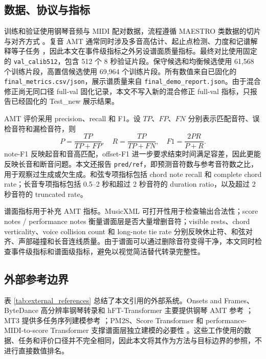 \documentclass[UTF8,a4paper,zihao=-4]{ctexart}
\newcommand{\code}[1]{\texttt{#1}}
\begin{document}


\subsection{数据、协议与指标}

训练和验证使用钢琴音频与 MIDI 配对数据，流程遵循 MAESTRO 类数据的切片与对齐方式 \cite{hawthorne2019maestro}。复音 AMT 通常同时涉及多音高估计、起止点检测、力度和记谱解释等子任务 \cite{benetos2019overview}，因此本文在事件级指标之外另设谱面质量指标。最终对比使用固定的 \code{val\_calib512}，包含 512 个 8 秒验证片段。保守候选和均衡候选使用 61,568 个训练片段，高置信候选使用 69,964 个训练片段。所有数值来自已固化的 \code{final\_metrics.csv/json}，展示谱质量来自 \code{final\_demo\_report.json}。由于混合修正尚无同口径 full-val 固化记录，本文不写入新的混合修正 full-val 指标，只报告已经固化的 Test\_new 展示结果。

AMT 评价采用 precision、recall 和 F1。设 $TP$、$FP$、$FN$ 分别表示匹配音符、误检音符和漏检音符，则
\begin{equation}
P=\frac{TP}{TP+FP}, \quad R=\frac{TP}{TP+FN}, \quad F1=\frac{2PR}{P+R}.
\end{equation}
note-F1 反映起音和音高匹配，offset-F1 进一步要求结束时间满足容差，因此更能反映长音和断音问题。本文还报告 \code{pred/ref}，即预测音符数与参考音符数之比，用于观察过生成或欠生成。和弦专项指标包括 chord note recall 和 complete chord rate；长音专项指标包括 0.5--2 秒和超过 2 秒音符的 duration ratio，以及超过 2 秒音符的 truncated rate。

谱面指标用于补充 AMT 指标。MusicXML 可打开性用于检查输出合法性；score notes / performance notes 衡量谱面层是否大量增删音符；visible rests、chord verticality、voice collision count 和 long-note tie rate 分别反映休止符、和弦对齐、声部碰撞和长音连线质量。由于谱面可以通过删除音符变得干净，本文同时检查事件级指标和谱面级指标，避免以视觉简洁替代转录完整性。

\subsection{外部参考边界}

表 \ref{tab:external_references} 总结了本文引用的外部系统。Onsets and Frames、ByteDance 高分辨率钢琴转录和 hFT-Transformer 主要提供钢琴 AMT 参考 \cite{hawthorne2018onsets,kong2021highres,toyama2023hft}；MT3 提供多任务序列建模参考 \cite{gardner2022mt3}；PM2S、Score Transformer 和 performance-MIDI-to-score Transformer 支撑谱面层独立建模的必要性 \cite{liu2022pm2s,suzuki2021scoretransformer,beyer2024midi2score}。这些工作使用的数据、任务和评价口径并不完全相同，因此本文将其作为方法与目标边界的参照，不进行直接数值排名。
\end{document}
